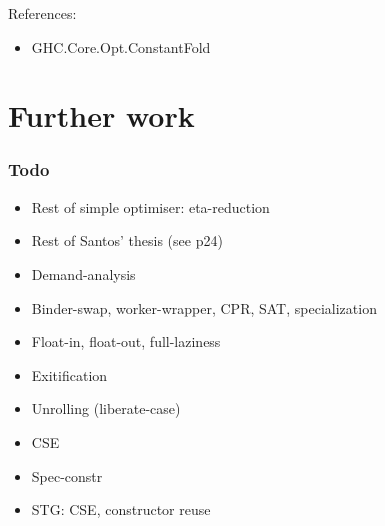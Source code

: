 \documentclass[aspectratio=169]{beamer}
\begin{document}
\begin{frame}
  References:
  \begin{itemize}
    \item GHC.Core.Opt.ConstantFold
  \end{itemize}
\end{frame}

\section{Further work}

\begin{frame}
  \frametitle{Todo}

  \begin{itemize}
    \item Rest of simple optimiser: eta-reduction
    \item Rest of Santos' thesis (see p24)
    \item Demand-analysis
    \item Binder-swap, worker-wrapper, CPR, SAT, specialization
    \item Float-in, float-out, full-laziness
    \item Exitification
    \item Unrolling (liberate-case)
    \item CSE
    \item Spec-constr
    \item STG: CSE, constructor reuse
  \end{itemize}

\end{frame}
\end{document}
